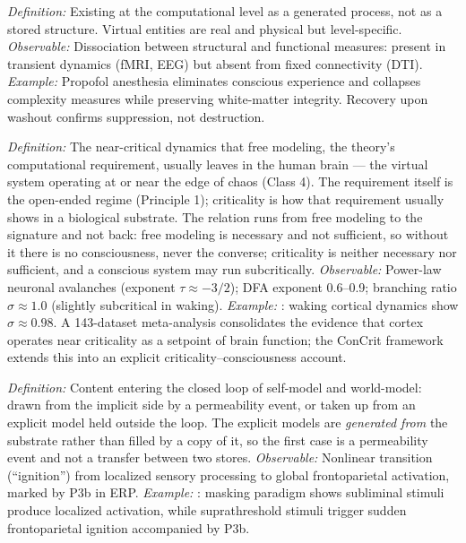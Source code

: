 \documentclass[12pt]{article}
\begin{document}
\begin{description}[leftmargin=0pt,labelindent=0pt,itemsep=0.8em]
\item[\textsc{Virtual} (as in FMT)] \emph{Definition:} Existing at the computational level as a generated process, not as a stored structure. Virtual entities are real and physical but level-specific. \emph{Observable:} Dissociation between structural and functional measures: present in transient dynamics (fMRI, EEG) but absent from fixed connectivity (DTI). \emph{Example:} Propofol anesthesia eliminates conscious experience and collapses complexity measures \citep{Casali2013} while preserving white-matter integrity. Recovery upon washout confirms suppression, not destruction.

\item[\textsc{Criticality}] \emph{Definition:} The near-critical dynamics that free modeling, the theory's computational requirement, usually leaves in the human brain --- the virtual system operating at or near the edge of chaos (Class 4). The requirement itself is the open-ended regime (Principle 1); criticality is how that requirement usually shows in a biological substrate. The relation runs from free modeling to the signature and not back: free modeling is necessary and not sufficient, so without it there is no consciousness, never the converse; criticality is neither necessary nor sufficient, and a conscious system may run subcritically. \emph{Observable:} Power-law neuronal avalanches (exponent $\tau \approx -3/2$); DFA exponent 0.6--0.9; branching ratio $\sigma \approx 1.0$ (slightly subcritical in waking). \emph{Example:} \citet{Priesemann2014}: waking cortical dynamics show $\sigma \approx 0.98$. A 143-dataset meta-analysis \citep{HengenShew2025} consolidates the evidence that cortex operates near criticality as a setpoint of brain function; the ConCrit framework \citep{AlgomShriki2026} extends this into an explicit criticality--consciousness account.

\item[\textsc{``Becomes conscious''}] \emph{Definition:} Content entering the closed loop of self-model and world-model: drawn from the implicit side by a permeability event, or taken up from an explicit model held outside the loop. The explicit models are \emph{generated from} the substrate rather than filled by a copy of it, so the first case is a permeability event and not a transfer between two stores. \emph{Observable:} Nonlinear transition (``ignition'') from localized sensory processing to global frontoparietal activation, marked by P3b in ERP. \emph{Example:} \citet{Dehaene2006}: masking paradigm shows subliminal stimuli produce localized activation, while suprathreshold stimuli trigger sudden frontoparietal ignition accompanied by P3b.

\end{description}
\end{document}
